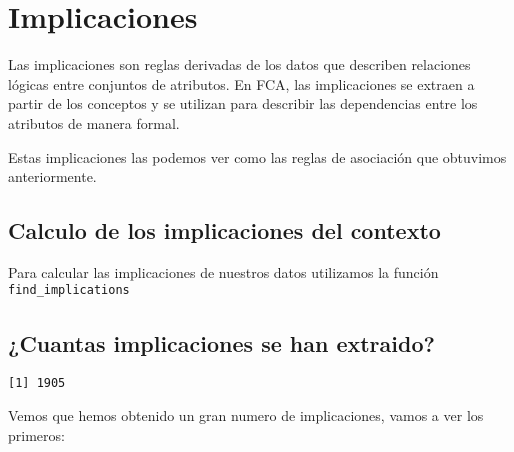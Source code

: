 \documentclass[
  letterpaper,
  DIV=11,
  numbers=noendperiod]{scrreprt}
\newenvironment{Shaded}{\begin{snugshade}}{\end{snugshade}}
\newcommand{\FunctionTok}[1]{\textcolor[rgb]{0.28,0.35,0.67}{#1}}
\newcommand{\NormalTok}[1]{\textcolor[rgb]{0.00,0.23,0.31}{#1}}
\newcommand{\SpecialCharTok}[1]{\textcolor[rgb]{0.37,0.37,0.37}{#1}}
\begin{document}
\section{Implicaciones}\label{implicaciones}

Las implicaciones son reglas derivadas de los datos que describen
relaciones lógicas entre conjuntos de atributos. En FCA, las
implicaciones se extraen a partir de los conceptos y se utilizan para
describir las dependencias entre los atributos de manera formal.

Estas implicaciones las podemos ver como las reglas de asociación que
obtuvimos anteriormente.

\subsection{Calculo de los implicaciones del
contexto}\label{calculo-de-los-implicaciones-del-contexto}

Para calcular las implicaciones de nuestros datos utilizamos la función
\texttt{find\_implications}

\subsection{¿Cuantas implicaciones se han
extraido?}\label{cuantas-implicaciones-se-han-extraido}

\begin{Shaded}
\end{Shaded}

\begin{verbatim}
[1] 1905
\end{verbatim}

Vemos que hemos obtenido un gran numero de implicaciones, vamos a ver
los primeros:

\begin{Shaded}
\end{Shaded}
\end{document}
